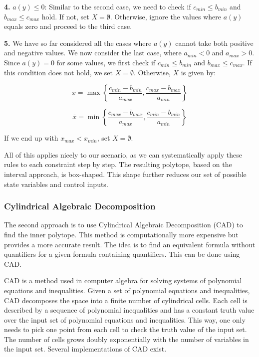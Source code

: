 \textbf{4.}
$a(y) \leq 0$:
Similar to the second case, we need to check if $c_{min} \leq b_{min}$ and $b_{max} \leq c_{max}$ hold.
If not, set $X=\emptyset$.
Otherwise, ignore the values where $a(y)$ equals zero and proceed to the third case.

\textbf{5.}
We have so far considered all the cases where $a(y)$ cannot take both positive and negative values.
We now consider the last case, where $a_{min} < 0$ and $a_{max} > 0$.
Since $a(y) = 0$ for some values, we first check if $c_{min} \leq b_{min}$ and $b_{max} \leq c_{max}$.
If this condition does not hold, we set $X = \emptyset$.
Otherwise, $X$ is given by:

\[ \underline{x} = \max \left\{ \frac{c_{min} - b_{min}}{a_{max}}, \frac{c_{max} - b_{max}}{a_{min}}
	\right\} \]

\[ \overline{x} = \min \left\{ \frac{c_{max} - b_{max}}{a_{max}}, \frac{c_{min} - b_{min}}{a_{min}} \right\} \]

If we end up with $x_{max} < x_{min}$, set $X=\emptyset$.

All of this applies nicely to our scenario, as we can systematically apply these rules to each constraint step by step.
The resulting polytope, based on the interval approach, is box-shaped.
This shape further reduces our set of possible state variables and control inputs.

\subsubsection{Cylindrical Algebraic Decomposition}

The second approach is to use Cylindrical Algebraic Decomposition (CAD) to find the inner polytope.
This method is computationally more expensive but provides a more accurate result.
The idea is to find an equivalent formula without quantifiers for a given formula containing quantifiers.
This can be done using CAD.

CAD is a method used in computer algebra for solving systems of polynomial equations and inequalities.
Given a set of polynomial equations and inequalities, CAD decomposes the space into a finite number of cylindrical cells.
Each cell is described by a sequence of polynomial inequalities and has a constant truth value over the input set of polynomial equations and
inequalities.
This way, one only needs to pick one point from each cell to check the truth value of the input set.
The number of cells grows doubly exponentially with the number of variables in the input set.
Several implementations of CAD exist.

